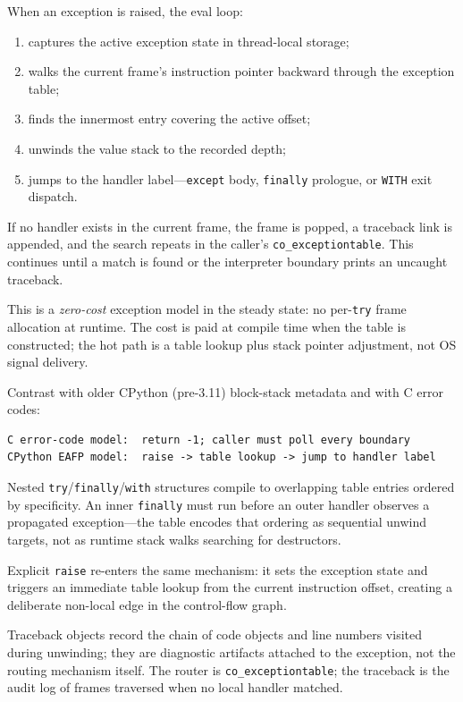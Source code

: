 \documentclass[a4paper,twoside]{report}
\begin{document}
When an exception is raised, the eval loop:

\begin{enumerate}
    \item captures the active exception state in thread-local storage;
    \item walks the current frame's instruction pointer backward through the exception table;
    \item finds the innermost entry covering the active offset;
    \item unwinds the value stack to the recorded depth;
    \item jumps to the handler label---\texttt{except} body, \texttt{finally} prologue, or \texttt{WITH} exit dispatch.
\end{enumerate}

If no handler exists in the current frame, the frame is popped, a traceback link is appended, and the search repeats in the caller's \texttt{co\_exceptiontable}. This continues until a match is found or the interpreter boundary prints an uncaught traceback.

This is a \emph{zero-cost} exception model in the steady state: no per-\texttt{try} frame allocation at runtime. The cost is paid at compile time when the table is constructed; the hot path is a table lookup plus stack pointer adjustment, not OS signal delivery.

Contrast with older CPython (pre-3.11) block-stack metadata and with C error codes:

\begin{verbatim}
C error-code model:  return -1; caller must poll every boundary
CPython EAFP model:  raise -> table lookup -> jump to handler label
\end{verbatim}

Nested \texttt{try}/\texttt{finally}/\texttt{with} structures compile to overlapping table entries ordered by specificity. An inner \texttt{finally} must run before an outer handler observes a propagated exception---the table encodes that ordering as sequential unwind targets, not as runtime stack walks searching for destructors.

Explicit \texttt{raise} re-enters the same mechanism: it sets the exception state and triggers an immediate table lookup from the current instruction offset, creating a deliberate non-local edge in the control-flow graph.

Traceback objects record the chain of code objects and line numbers visited during unwinding; they are diagnostic artifacts attached to the exception, not the routing mechanism itself. The router is \texttt{co\_exceptiontable}; the traceback is the audit log of frames traversed when no local handler matched.
\end{document}
